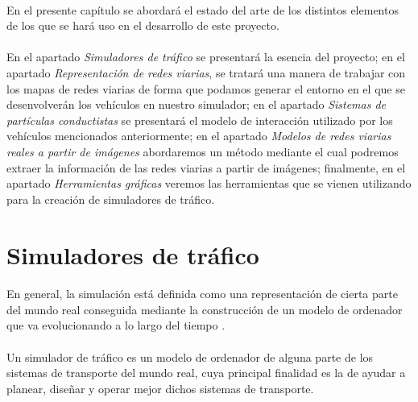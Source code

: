 	\paragraph{}
	En el presente capítulo se abordará el estado del arte de los distintos elementos de los que se hará uso en el desarrollo de este proyecto.
	
	\paragraph{}
	En el apartado \emph{Simuladores de tráfico} se presentará la esencia del proyecto; en el apartado \emph{Representación de redes viarias}, se tratará una manera de trabajar con los mapas de redes viarias de forma que podamos generar el entorno en el que se desenvolverán los vehículos en nuestro simulador; en el apartado \emph{Sistemas de partículas conductistas} se presentará el modelo de interacción utilizado por los vehículos mencionados anteriormente; en el apartado \emph{Modelos de redes viarias reales a partir de imágenes} abordaremos un método mediante el cual podremos extraer la información de las redes viarias a partir de imágenes; finalmente, en el apartado \emph{Herramientas gráficas} veremos las herramientas que se vienen utilizando para la creación de simuladores de tráfico.

\section{Simuladores de tráfico}


	\paragraph{}
	En general, la simulación está definida como una representación de cierta parte del mundo real conseguida mediante la construcción de un modelo de ordenador que va evolucionando a lo largo del tiempo \cite{Drew1968}.
	
	\paragraph{}
	Un simulador de tráfico es un modelo de ordenador de alguna parte de los sistemas de transporte del mundo real, cuya principal finalidad es la de ayudar a planear, diseñar y operar mejor dichos sistemas de transporte.
	

